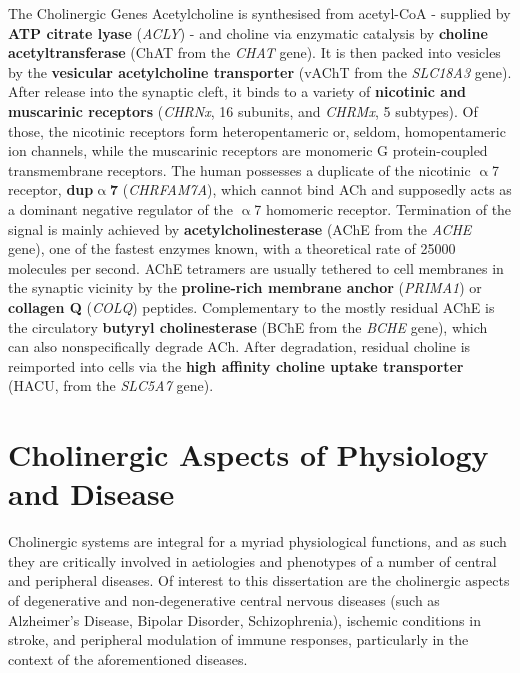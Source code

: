 \begin{mybox}{The Cholinergic Genes}\label{box:chol-genes}
Acetylcholine is synthesised from acetyl-CoA - supplied by \textbf{ATP citrate lyase} (\emph{ACLY}) - and choline via enzymatic catalysis by \textbf{choline acetyltransferase} (ChAT from the \emph{CHAT} gene). It is then packed into vesicles by the \textbf{vesicular acetylcholine transporter} (vAChT from the \emph{SLC18A3} gene). After release into the synaptic cleft, it binds to a variety of \textbf{nicotinic and muscarinic receptors} (\emph{CHRNx}, 16 subunits, and \emph{CHRMx}, 5 subtypes). Of those, the nicotinic receptors form heteropentameric or, seldom, homopentameric ion channels, while the muscarinic receptors are monomeric G protein-coupled transmembrane receptors. The human possesses a duplicate of the nicotinic $\upalpha$7 receptor, \textbf{dup$\upalpha$7} (\emph{CHRFAM7A}), which cannot bind ACh and supposedly acts as a dominant negative regulator of the $\upalpha$7 homomeric receptor. Termination of the signal is mainly achieved by \textbf{acetylcholinesterase} (AChE from the \emph{ACHE} gene), one of the fastest enzymes known, with a theoretical rate of \num{25000} molecules per second. AChE tetramers are usually tethered to cell membranes in the synaptic vicinity by the \textbf{proline-rich membrane anchor} (\emph{PRIMA1}) or \textbf{collagen Q} (\emph{COLQ}) peptides. Complementary to the mostly residual AChE is the circulatory \textbf{butyryl cholinesterase} (BChE from the \emph{BCHE} gene), which can also nonspecifically degrade ACh. After degradation, residual choline is reimported into cells via the \textbf{high affinity choline uptake transporter} (HACU, from the \emph{SLC5A7} gene).
\end{mybox}

\section{Cholinergic Aspects of Physiology and Disease} \label{sec:intro:diseases}
Cholinergic systems are integral for a myriad physiological functions, and as such they are critically involved in aetiologies and phenotypes of a number of central and peripheral diseases. Of interest to this dissertation are the cholinergic aspects of degenerative and non-degenerative central nervous diseases (such as Alzheimer's Disease, Bipolar Disorder, Schizophrenia), ischemic conditions in stroke, and peripheral modulation of immune responses, particularly in the context of the aforementioned diseases.

